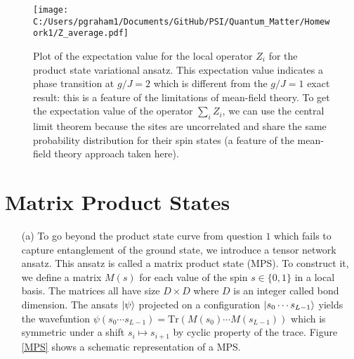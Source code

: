 \documentclass[10pt, a4paper]{article}
\begin{document}
{\begin{enumerate}
\begin{figure}
    \centering
    \texttt{[image: C:/Users/pgraham1/Documents/GitHub/PSI/Quantum\_Matter/Homework1/Z\_average.pdf]}
    \caption{Plot of the expectation value for the local operator $Z_i$ for the product state variational ansatz. This expectation value indicates a phase transition at $g/J =2$ which is different from the $g/J=1$ exact result: this is a feature of the limitations of mean-field theory. To get the expectation value of the operator $\sum_i Z_i$, we can use the central limit theorem because the sites are uncorrelated and share the same probability distribution for their spin states (a feature of the mean-field theory approach taken here).\label{Transition}}
  \end{figure}
\end{enumerate}

\newpage

\section{Matrix Product States}

\begin{enumerate}
  \item[(a)] To go beyond the product state curve from question $1$ which fails to capture entanglement of the ground state, we introduce a tensor network ansatz. This ansatz is called a matrix product state (MPS). To construct it, we define a matrix $M(s)$ for each value of the spin $s\in \{0, 1\}$ in a local basis. The matrices all have size $D \times D$ where $D$ is an integer called bond dimension. The ansats $\ket{\psi}$ projected on a configuration $\ket{s_0 \cdots s_{L-1}}$ yields the wavefuntion $\psi(s_0 \cdots s_{L-1}) = \text{Tr}(M(s_0)\cdots M(s_{L-1}))$ which is symmetric under a shift $s_i \mapsto s_{i+1}$ by cyclic property of the trace. Figure \ref{MPS} shows a schematic representation of a MPS. 
  \begin{figure}
    \centering
\end{figure}
\end{enumerate}}
\end{document}
